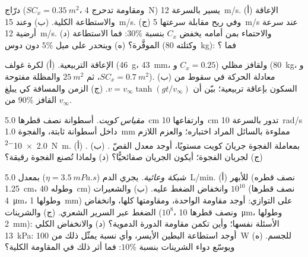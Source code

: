 \begin{exercise}[$\star\star$]\label{exo:b2:viscous-flows:7}
درّاج ($SC_x = \qty{0.35}{m^2}$، ومقاومة تدحرج \qty{4}{N}) يسير بالسرعة
\qty{12}{m/s}. (أ) الإعاقة والاستطاعة الكلية. (ب) وعند \qty{15}{m/s}. (ج) وفي
ريح مقابلة سرعتها \qty{5}{m/s} عند سرعة أرضية \qty{12}{m/s}. (د) والاحتماء
بمن أمامه يخفض $C_x$ بنسبة $30\%$: فما الاستطاعة الموفَّرة؟ (ه) وينحدر على ميل $5\%$ دون دوس
(وكتلته \qty{80}{kg}): فما ؟
\end{exercise}

\begin{exercise}[$\star\star$]\label{exo:b2:viscous-flows:8}
الإعاقة التربيعية. (أ)  لكرة غولف (\qty{46}{g}، \qty{43}{mm}،
و $C_x = 0.25$) ولقافز مظلي (\qty{80}{kg}، و $SC_x = \qty{0.7}{m^2}$، ثم
$\qty{25}{m^2}$ والمظلة مفتوحة). (ب) معادلة الحركة في سقوط
من السكون بإعاقة تربيعية؛ بيّن أن $v = v_\infty\tanh(gt/v_\infty)$. (ج)
الزمن والمسافة كي يبلغ القافز $90\%$ من $v_\infty$.
\end{exercise}

\begin{exercise}[$\star\star$]\label{exo:b2:viscous-flows:9}
\emph{مقياس  كويت.} أسطوانة نصف قطرها \qty{5.0}{cm} وارتفاعها
\qty{10}{cm} تدور بالسرعة \qty{10}{rad/s} داخل أسطوانة ثابتة، والفجوة
\qty{1.0}{mm} مملوءة بالسائل المراد اختباره؛ والعزم اللازم
\qty{2.0e-2}{N.m}. (أ) بمعاملة الفجوة جريانَ كويت مستويًا، أوجد معدل القصّ
. (ب) . (ج)  لجريان الفجوة؛
أيكون الجريان صفائحيًّا؟ (د) ولماذا تُصنع الفجوة رقيقة؟
\end{exercise}

\begin{exercise}[$\star\star\star$]\label{exo:b2:viscous-flows:10}
\emph{شبكة وعائية.} يجري الدم ($\eta = \qty{3.5}{mPa.s}$) بمعدل
\qty{5.0}{L/min}. (أ)  للأبهر (نصف قطره \qty{1.25}{cm}،
وطوله \qty{40}{cm}) وانخفاض الضغط عليه. (ب) والشعيرات $10^{10}$
(نصف قطرها \qty{4}{\micro m}، وطولها \qty{1}{mm}) على التوازي:
أوجد مقاومة الواحدة، ومقاومتها كلها، وانخفاض الضغط عبر السرير
الشعري. (ج) والشرينات ($10^8$، ونصف قطرها \qty{10}{\micro m}، وطولها
\qty{2}{mm}): الأسئلة نفسها؛ وأين تكمن مقاومة الدورة الدموية؟
(د) والانخفاض الكلي \qty{13}{kPa}: أوجد استطاعة البطين الأيسر،
وأي نسبة يمثّل ذلك من \qty{100}{W} للجسم. (ه) ويوسّع دواء
الشرينات بنسبة $10\%$: فما أثر ذلك في المقاومة الكلية؟
\end{exercise}

